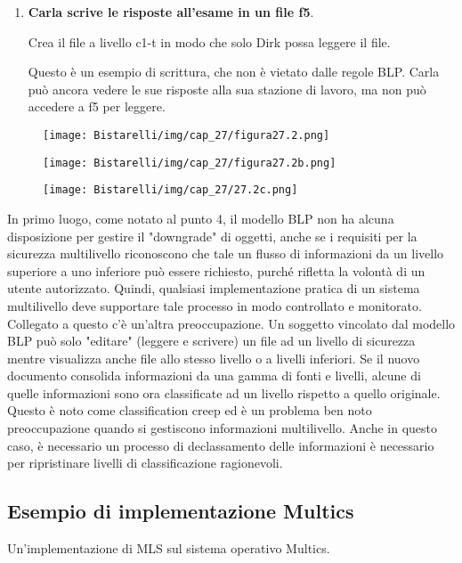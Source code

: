 \begin{enumerate}
    \item \textbf{Carla scrive le risposte all'esame in un file f5}. 
    
Crea il file a livello c1-t in modo che solo Dirk possa leggere il file.

\singlespacing

Questo è un esempio di scrittura, che non è vietato dalle regole BLP. Carla può ancora vedere le sue risposte alla sua stazione di lavoro, ma non può accedere a f5 per leggere.
\end{enumerate}

\newpage
\begin{figure}[H]
	\centering
    \texttt{[image: Bistarelli/img/cap\_27/figura27.2.png]}
\end{figure}

\begin{figure}[H]
	\centering
    \texttt{[image: Bistarelli/img/cap\_27/figura27.2b.png]}
\end{figure}

\begin{figure}[H]
	\centering
    \texttt{[image: Bistarelli/img/cap\_27/27.2c.png]}
\end{figure}


In primo luogo, come notato al punto 4, il modello BLP non ha alcuna disposizione per gestire il "downgrade" di oggetti, anche se i requisiti per la sicurezza multilivello riconoscono che tale un flusso di informazioni da un livello superiore a uno inferiore può essere richiesto, purché rifletta la volontà di un utente autorizzato. Quindi, qualsiasi implementazione pratica di un sistema multilivello deve supportare tale processo in modo controllato e monitorato. Collegato a questo c'è un'altra preoccupazione. Un soggetto vincolato dal modello BLP può solo "editare" (leggere e scrivere) un file ad un livello di sicurezza mentre visualizza anche file allo stesso livello o a livelli inferiori. Se il nuovo documento consolida informazioni da una gamma di fonti e livelli, alcune di quelle informazioni sono ora classificate ad un livello rispetto a quello originale. Questo è noto come classification creep ed è un problema ben noto preoccupazione quando si gestiscono informazioni multilivello. Anche in questo caso, è necessario un processo di declassamento delle informazioni è necessario per ripristinare livelli di classificazione ragionevoli.
\newpage
\subsection{Esempio di implementazione Multics}
Un'implementazione di MLS sul sistema operativo Multics.

